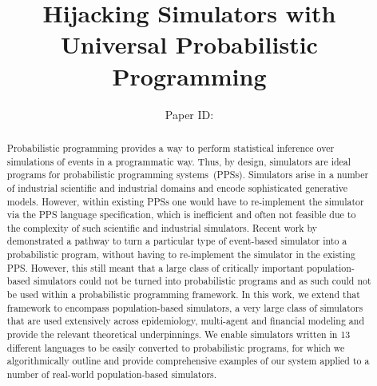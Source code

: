 \documentclass{article}
\title{Hijacking Simulators with Universal Probabilistic Programming}
\author{%
Paper ID: }
\begin{document}

\maketitle

\begin{abstract}


Probabilistic programming provides a way to perform statistical inference over simulations of events in a programmatic way. Thus, by design, simulators are ideal programs for probabilistic programming systems~(PPSs).
Simulators arise in a number of industrial scientific and industrial domains and encode sophisticated generative models.
However, within existing PPSs one would have to re-implement the simulator via the PPS language specification, which is inefficient and often not feasible due to the complexity of such scientific and industrial simulators.
Recent work by \cite{baydin2018efficient} demonstrated a pathway to turn a particular
type of event-based simulator into a probabilistic program, without having to re-implement the simulator in the existing PPS. 
 However, this still meant that a large class of critically important population-based simulators could not be turned into probabilistic programs and as such could not be used within a probabilistic programming framework.
In this work, we extend that framework to encompass population-based simulators, a very large class of simulators that are used extensively across epidemiology, multi-agent and financial modeling and provide the relevant
theoretical underpinnings. 
We enable simulators written in 13 different languages to be easily converted to probabilistic programs, for which we algorithmically outline and provide comprehensive examples of our system applied to a number of real-world population-based simulators.


\end{abstract}
\end{document}
